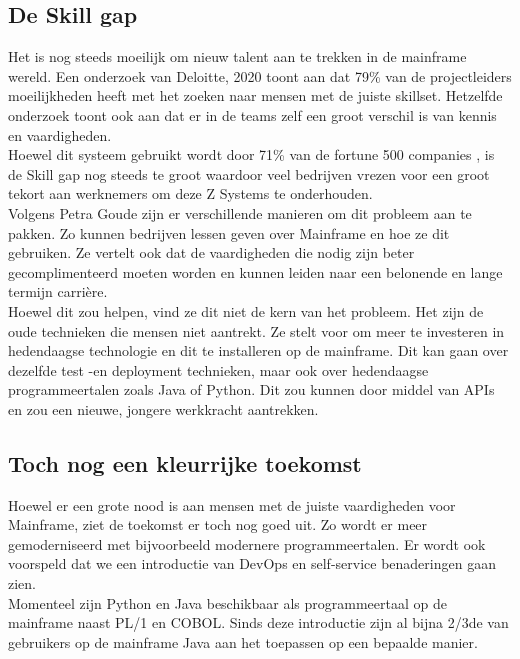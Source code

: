 \subsection{De Skill gap}
Het is nog steeds moeilijk om nieuw talent aan te trekken in de mainframe wereld. Een onderzoek van Deloitte, 2020 %
toont aan dat 79\% van de projectleiders moeilijkheden heeft met het zoeken naar mensen met de juiste skillset. Hetzelfde onderzoek toont ook aan dat er in de teams zelf een groot verschil is van kennis en vaardigheden.  \\ Hoewel dit systeem gebruikt wordt door 71\% van de fortune 500 companies \autocite{Tozzi2022} , is de Skill gap nog steeds te groot waardoor veel bedrijven vrezen voor een groot tekort aan werknemers om deze Z Systems te onderhouden.
\\
Volgens Petra Goude zijn er verschillende manieren om dit probleem aan te pakken. Zo kunnen bedrijven lessen geven over Mainframe en hoe ze dit gebruiken. Ze vertelt ook dat de vaardigheden die nodig zijn beter gecomplimenteerd moeten worden en kunnen leiden naar een belonende en lange termijn carrière. \\ Hoewel dit zou helpen, vind ze dit niet de kern van het probleem. Het zijn de oude technieken die mensen niet aantrekt. Ze stelt voor om meer te investeren in hedendaagse technologie en dit te installeren op de mainframe. Dit kan gaan over dezelfde test -en deployment technieken, maar ook over hedendaagse programmeertalen zoals Java of Python. Dit zou kunnen door middel van APIs en zou een nieuwe, jongere werkkracht aantrekken. \autocite{Goude2023}


\subsection{Toch nog een kleurrijke toekomst}
Hoewel er een grote nood is aan mensen met de juiste vaardigheden voor Mainframe, ziet de toekomst er toch nog goed uit. Zo wordt er meer gemoderniseerd met bijvoorbeeld modernere programmeertalen. Er wordt ook voorspeld dat we een introductie van DevOps en self-service benaderingen gaan zien. \autocite{Pennaz2023} \\
Momenteel zijn Python en Java beschikbaar als programmeertaal op de mainframe naast PL/1 en COBOL.
Sinds deze introductie zijn al bijna 2/3de van gebruikers op de mainframe Java aan het toepassen op een bepaalde manier. \autocite{Watts2018}



